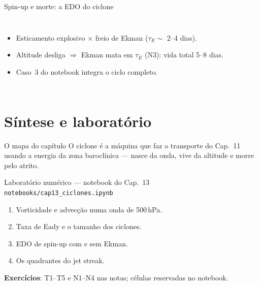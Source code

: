 \documentclass[aspectratio=169,11pt]{beamer}
\begin{document}
\begin{frame}{Spin-up e morte: a EDO do ciclone}
  \begin{columns}
    \vspace{0.4em}
    \begin{itemize}
      \item Esticamento explosivo × freio de Ekman
            ($\tau_E \sim$ 2--4 dias).
      \item Altitude desliga $\Rightarrow$ Ekman mata em $\tau_E$
            (N3): vida total 5--8 dias.
      \item Caso~3 do notebook integra o ciclo completo.
    \end{itemize}
  \end{columns}
\end{frame}

\section{Síntese e laboratório}

\begin{frame}{O mapa do capítulo}
  \vspace{0.6em}
  O ciclone é a máquina que faz o transporte do Cap.~11 usando a
  energia da zona baroclínica — nasce da onda, vive da altitude e
  morre pelo atrito.
\end{frame}

\begin{frame}{Laboratório numérico --- notebook do Cap.~13}
  \texttt{notebooks/cap13\_ciclones.ipynb}
  \begin{enumerate}
    \item Vorticidade e advecção numa onda de 500\,hPa.
    \item Taxa de Eady e o tamanho dos ciclones.
    \item EDO de spin-up com e sem Ekman.
    \item Os quadrantes do jet streak.
  \end{enumerate}
  \vspace{0.4em}
  \textbf{Exercícios}: T1--T5 e N1--N4 nas notas; células reservadas no
  notebook.
  \vfill
  \atribuicao
\end{frame}
\end{document}
